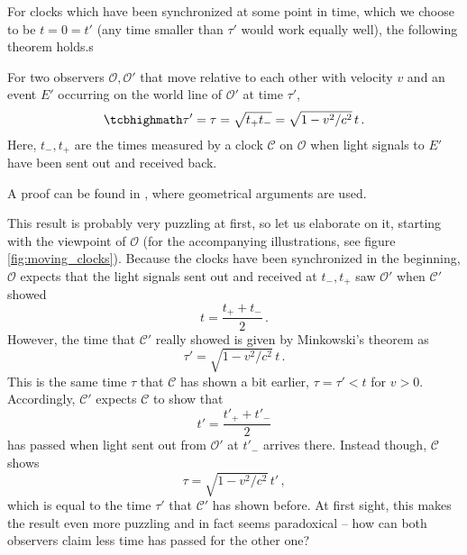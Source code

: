 For clocks which have been synchronized at some point in time, which we choose to be $t = 0 = t'$ (any time smaller than $\tau'$ would work equally well), the following theorem holds.s
\begin{thm}\label{thm:minkowski_moving_clocks}
	For two observers $\mathcal{O}, \mathcal{O}'$ that move relative to each other with velocity $v$ and an event $E'$ occurring on the world line of $\mathcal{O}'$ at time $\tau'$,
	\begin{equation}
		\eqbox{
		\tau' = \tau = \sqrt{t_+ t_-} = \sqrt{1 - v^2 / c^2} \, t
		} \, .
	\end{equation}
	Here, $t_-, t_+$ are the times measured by a clock $\mathcal{C}$ on $\mathcal{O}$ when light signals to $E'$ have been sent out and received back.
\end{thm}
A proof can be found in \cite{dragon_geometry_srt}, where geometrical arguments are used.

\iffalse
{
Clocks moving relative to each other de-synchronize, they do \emph{not} show each other equal times $t = t'$ anymore. Instead, simultaneous to $\mathcal{C}$ showing $t$, $\mathcal{O}$ observes
\begin{equation}
	\tau' = \sqrt{1 - \frac{v^2}{c^2}} \, t
\end{equation}
on $\mathcal{C}'$. Accordingly, simultaneous to $t'$, $\mathcal{O}'$ observes
\begin{equation}
	\tau = \sqrt{1 - \frac{v^2}{c^2}} \, t'
\end{equation}
on $\mathcal{C}$.
}
\fi
This result is probably very puzzling at first, so let us elaborate on it, starting with the viewpoint of $\mathcal{O}$ (for the accompanying illustrations, see figure \ref{fig:moving_clocks}). Because the clocks have been synchronized in the beginning, $\mathcal{O}$ expects that the light signals sent out and received at $t_-, t_+$ saw $\mathcal{O}'$ when $\mathcal{C}'$ showed
\begin{equation*}
	t = \frac{t_+ + t_-}{2} \, .
\end{equation*}
However, the time that $\mathcal{C}'$ really showed is given by Minkowski's theorem as
\begin{equation}
	\tau' = \sqrt{1 - v^2 / c^2} \, t \, .
\end{equation}
This is the same time $\tau$ that $\mathcal{C}$ has shown a bit earlier, $\tau = \tau' < t$ for $v > 0$. Accordingly, $\mathcal{C}'$ expects $\mathcal{C}$ to show that
\begin{equation*}
	t' = \frac{t'_+ + t'_-}{2}
\end{equation*}
has passed when light sent out from $\mathcal{O}'$ at $t'_-$ arrives there. Instead though, $\mathcal{C}$ shows
\begin{equation}
	\tau = \sqrt{1 - v^2 / c^2} \, t' \, ,
\end{equation}
which is equal to the time $\tau'$ that $\mathcal{C}'$ has shown before. At first sight, this makes the result even more puzzling and in fact seems paradoxical -- how can both observers claim less time has passed for the other one?

